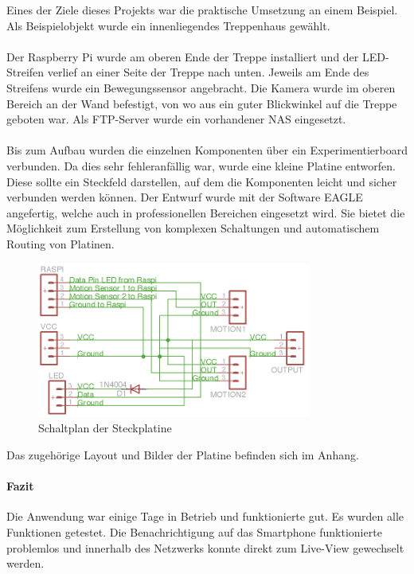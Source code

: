 Eines der Ziele dieses Projekts war die praktische Umsetzung an einem Beispiel. Als Beispielobjekt wurde ein innenliegendes Treppenhaus gewählt. \\\\
Der Raspberry Pi wurde am oberen Ende der Treppe installiert und der LED-Streifen verlief an einer Seite der Treppe nach unten. Jeweils am Ende des Streifens wurde ein Bewegungssensor angebracht. Die Kamera wurde im oberen Bereich an der Wand befestigt, von wo aus ein guter Blickwinkel auf die Treppe geboten war. Als FTP-Server wurde ein vorhandener NAS eingesetzt.\\\\
Bis zum Aufbau wurden die einzelnen Komponenten über ein Experimentierboard verbunden. Da dies sehr fehleranfällig war, wurde eine kleine Platine entworfen. Diese sollte ein Steckfeld darstellen, auf dem die Komponenten leicht und sicher verbunden werden können. Der Entwurf wurde mit der Software EAGLE angefertig, welche auch in professionellen Bereichen eingesetzt wird. Sie bietet die Möglichkeit zum Erstellung von komplexen Schaltungen und automatischem Routing von Platinen. 
\begin{figure}[h]
	\begin{minipage}{\textwidth}
		\centering
		\includegraphics[width=0.8\textwidth]{./data/eagle.png}
		\caption{Schaltplan der Steckplatine}
	\end{minipage}
\end{figure}

Das zugehörige Layout und Bilder der Platine befinden sich im Anhang.
\paragraph{Fazit} Die Anwendung war einige Tage in Betrieb und funktionierte gut. Es wurden alle Funktionen getestet. Die Benachrichtigung auf das Smartphone funktionierte problemlos und innerhalb des Netzwerks konnte direkt zum Live-View gewechselt werden. 